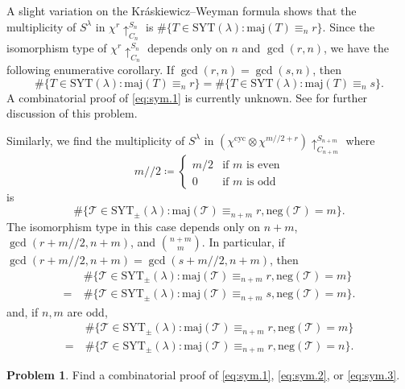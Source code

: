 \documentclass[11pt]{article}
\theoremstyle{definition}
\newtheorem{prob}[theo]{Problem}
\numberwithin{equation}{section}
\newcommand\maj{\mathrm{maj}}
\newcommand\negg{\mathrm{neg}}
\newcommand\SYT{\mathrm{SYT}}
\begin{document}
A slight variation on the Kr\'askiewicz--Weyman formula shows that the multiplicity of $S^\lambda$ in $\chi^r\uparrow_{C_n}^{S_n}$ is $\#\{T \in \SYT(\lambda) : \maj(T) \equiv_n r \}$. Since the isomorphism type of $\chi^r\uparrow_{C_n}^{S_n}$ depends only on $n$ and $\gcd(r, n)$, we have the following enumerative corollary. If $\gcd(r, n) = \gcd(s, n)$, then
\begin{equation}\label{eq:sym.1}
  \#\{T \in \SYT(\lambda) : \maj(T) \equiv_n r \} = \#\{T \in \SYT(\lambda) : \maj(T) \equiv_n s \}.
\end{equation}
A combinatorial proof of \eqref{eq:sym.1} is currently unknown. See \cite{AS} for further discussion of this problem.

Similarly, we find the multiplicity of $S^\lambda$ in $(\chi^{\mathrm{cyc}} \otimes \chi^{m/\!/2+r})\uparrow_{C_{n+m}}^{S_{n+m}}$ where
  \[ m/\!/2 \coloneqq \begin{cases}m/2 & \text{if $m$ is even} \\ 0 & \text{if $m$ is odd}\end{cases} \]
is
\begin{equation}
  \#\{\mathcal{T} \in \SYT_\pm(\lambda) : \maj(\mathcal{T}) \equiv_{n+m} r, \negg(\mathcal{T}) = m\}.
\end{equation}
The isomorphism type in this case depends only on $n+m$, $\gcd(r + m/\!/2, n+m)$, and $\binom{n+m}{m}$. In particular, if $\gcd(r + m/\!/2, n+m) = \gcd(s + m/\!/2, n+m)$, then
\begin{equation}\label{eq:sym.2}
\begin{split}
  &\#\{\mathcal{T} \in \SYT_\pm(\lambda) : \maj(\mathcal{T}) \equiv_{n+m} r, \negg(\mathcal{T}) = m\} \\
  =\ &\#\{\mathcal{T} \in \SYT_\pm(\lambda) : \maj(\mathcal{T}) \equiv_{n+m} s, \negg(\mathcal{T}) = m\}.
\end{split}
\end{equation}
and, if $n, m$ are odd,
\begin{equation}\label{eq:sym.3}
\begin{split}
  &\#\{\mathcal{T} \in \SYT_\pm(\lambda) : \maj(\mathcal{T}) \equiv_{n+m} r, \negg(\mathcal{T}) = m\} \\
  =\ &\#\{\mathcal{T} \in \SYT_\pm(\lambda) : \maj(\mathcal{T}) \equiv_{n+m} r, \negg(\mathcal{T}) = n\}.
\end{split}
\end{equation}

\begin{prob}
    Find a combinatorial proof of \eqref{eq:sym.1}, \eqref{eq:sym.2}, or \eqref{eq:sym.3}.
\end{prob}
\end{document}
